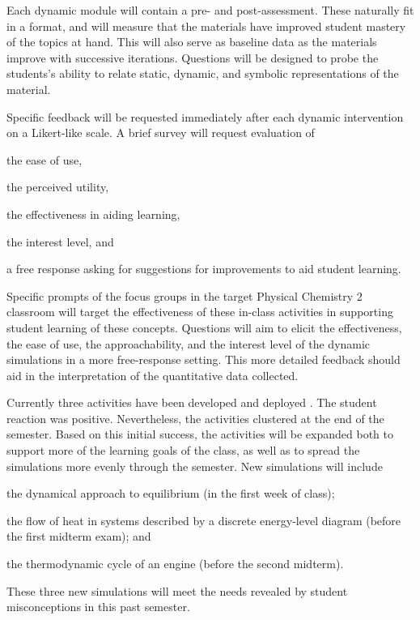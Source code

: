 \documentclass[10pt,letterpaper]{article}
\begin{document}
 Each dynamic module will contain a pre- and post-assessment. These naturally fit in a \pogil format, and will measure that the materials have improved student mastery of the topics at hand. This will also serve as baseline data as the materials improve with successive iterations. Questions will be designed to probe the students's ability to relate static, dynamic, and symbolic representations of the material.


 Specific feedback will be requested immediately after each dynamic intervention on a Likert-like scale. A brief survey will request evaluation of
\begin{enumerate*}[label=\textbf{\arabic*.)}]
  \item the ease of use, 
\item the perceived utility, 
\item the effectiveness in aiding learning, 
\item the interest level, and  
\item a free response asking for suggestions for improvements to aid student learning.
\end{enumerate*}

 Specific prompts of the focus groups in the target Physical Chemistry 2 classroom will target the effectiveness of these in-class activities in supporting student learning of these concepts. Questions will aim to elicit the effectiveness, the ease of use, the approachability, and the interest level of the dynamic simulations in a more free-response setting. This more detailed feedback should aid in the interpretation of the quantitative data collected.



%
%
Currently three activities have been developed and deployed . The student reaction was positive. Nevertheless, the activities clustered at the end of the semester. Based on this initial success, the activities will be expanded both to support more of the learning goals of the class, as well as to spread the simulations more evenly through the semester. New simulations will include 
\begin{enumerate*}[label=\textbf{\arabic*)}]
\item the dynamical approach to equilibrium (in the first week of class);
\item the flow of heat in systems described by a discrete energy-level diagram (before the first midterm exam); and
\item the thermodynamic cycle of an engine (before the second midterm).
\end{enumerate*}
These three new simulations will meet the needs revealed by student misconceptions in this past semester.
\end{document}
